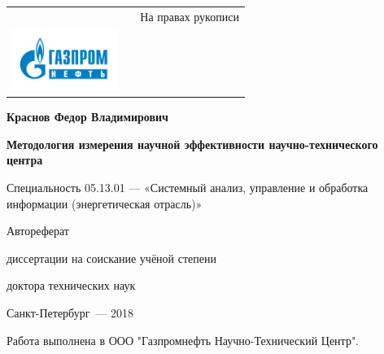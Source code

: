 \thispagestyle{empty}

\noindent%
\begin{tabularx}{\textwidth}{@{}lXr@{}}
    & & \large{На правах рукописи} \\
    \includegraphics[height=2.0cm]{images/logo2} {\rule[0pt]{0pt}{2.0cm}}
    &&
   \rule[0pt]{0pt}{1.5cm}
\end{tabularx}

\vspace{0pt plus1fill} %
\begin{center}
\textbf {\large Краснов Федор Владимирович}
\end{center}

\vspace{0pt plus3fill} %
\begin{center}
\textbf {\Large %
Методология измерения научной эффективности научно-технического центра}

\vspace{0pt plus3fill} %
{\large Специальность 05.13.01 — «Системный анализ, управление и обработка информации (энергетическая отрасль)»}

\vspace{0pt plus1.5fill} %
\Large{Автореферат}\par
\large{диссертации на соискание учёной степени\par доктора  технических наук}
\end{center}

\vspace{0pt plus4fill} %
{\centering Санкт-Петербург~--- 2018 \par}

\newpage
\thispagestyle{empty}
\noindent Работа выполнена в ООО "Газпромнефть Научно-Технический Центр".

